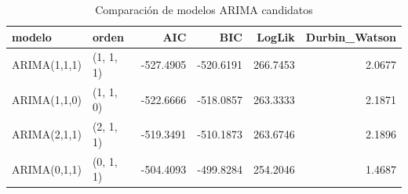 \begin{table}
\caption{Comparación de modelos ARIMA candidatos}
\label{tab:arima}
\begin{tabular}{llrrrr}
\toprule
modelo & orden & AIC & BIC & LogLik & Durbin_Watson \\
\midrule
ARIMA(1,1,1) & (1, 1, 1) & -527.4905 & -520.6191 & 266.7453 & 2.0677 \\
ARIMA(1,1,0) & (1, 1, 0) & -522.6666 & -518.0857 & 263.3333 & 2.1871 \\
ARIMA(2,1,1) & (2, 1, 1) & -519.3491 & -510.1873 & 263.6746 & 2.1896 \\
ARIMA(0,1,1) & (0, 1, 1) & -504.4093 & -499.8284 & 254.2046 & 1.4687 \\
\bottomrule
\end{tabular}
\end{table}
